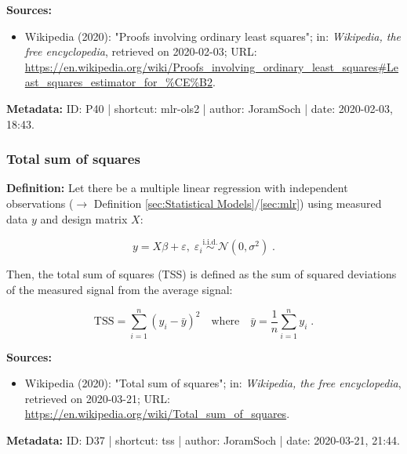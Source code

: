 \documentclass[a4paper,12pt,twoside]{book}
\begin{document}
\vspace{1em}
\textbf{Sources:}
\begin{itemize}
\item Wikipedia (2020): "Proofs involving ordinary least squares"; in: \textit{Wikipedia, the free encyclopedia}, retrieved on 2020-02-03; URL: \url{https://en.wikipedia.org/wiki/Proofs_involving_ordinary_least_squares#Least_squares_estimator_for_%CE%B2}.
\end{itemize}


\vspace{1em}
\textbf{Metadata:} ID: P40 | shortcut: mlr-ols2 | author: JoramSoch | date: 2020-02-03, 18:43.
\vspace{1em}



\subsubsection[\textit{Total sum of squares}]{Total sum of squares} \label{sec:tss}
\setcounter{equation}{0}

\textbf{Definition:} Let there be a multiple linear regression with independent observations ($\rightarrow$ Definition \ref{sec:Statistical Models}/\ref{sec:mlr}) using measured data $y$ and design matrix $X$:

\begin{equation} \label{eq:tss-mlr}
y = X\beta + \varepsilon, \; \varepsilon_i \overset{\mathrm{i.i.d.}}{\sim} \mathcal{N}(0, \sigma^2) \; .
\end{equation}

Then, the total sum of squares (TSS) is defined as the sum of squared deviations of the measured signal from the average signal:

\begin{equation} \label{eq:tss-tss}
\mathrm{TSS} = \sum_{i=1}^n (y_i - \bar{y})^2 \quad \text{where} \quad \bar{y} = \frac{1}{n} \sum_{i=1}^n y_i \; .
\end{equation}


\vspace{1em}
\textbf{Sources:}
\begin{itemize}
\item Wikipedia (2020): "Total sum of squares"; in: \textit{Wikipedia, the free encyclopedia}, retrieved on 2020-03-21; URL: \url{https://en.wikipedia.org/wiki/Total_sum_of_squares}.
\end{itemize}


\vspace{1em}
\textbf{Metadata:} ID: D37 | shortcut: tss | author: JoramSoch | date: 2020-03-21, 21:44.
\vspace{1em}
\end{document}

